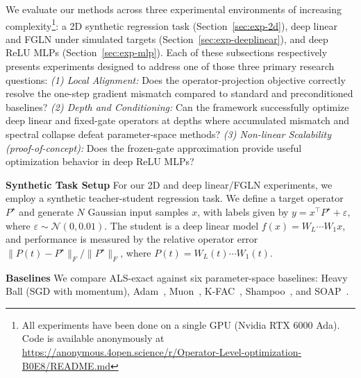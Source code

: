 \documentclass{article}
\newcommand{\normF}[1]{\|#1\|_F}
\begin{document}
We evaluate our methods across three experimental environments of increasing complexity\footnote{All experiments have been done on a single GPU (Nvidia RTX 6000 Ada). Code is available anonymously at \url{https://anonymous.4open.science/r/Operator-Level-optimization-B0E8/README.md}
}: a 2D synthetic regression task (Section~\ref{sec:exp-2d}), deep linear and FGLN under simulated targets (Section~\ref{sec:exp-deeplinear}), and deep ReLU MLPs (Section~\ref{sec:exp-mlp}). Each of these subsections respectively presents experiments designed to address one of those three primary research questions: \emph{ (1) Local Alignment:} Does the operator-projection objective correctly resolve the one-step gradient mismatch compared to standard and preconditioned baselines? \emph{(2) Depth and Conditioning:} Can the framework successfully optimize deep linear and fixed-gate operators at depths where accumulated mismatch and spectral collapse defeat parameter-space methods? \emph{(3) Non-linear Scalability (proof-of-concept):} Does the frozen-gate approximation provide useful optimization behavior in deep ReLU MLPs?

\textbf{Synthetic Task Setup}
For our 2D and deep linear/FGLN experiments, we employ a synthetic teacher-student regression task. We define a target operator $P^\star$ and generate $N$ Gaussian input samples $x$, with labels given by $y = x^\top P^\star + \varepsilon$, where $\varepsilon \sim \mathcal{N}(0, 0.01)$. The student is a deep linear model $f(x) = W_L \cdots W_1 x$, and performance is measured by the relative operator error $\normF{P(t) - P^\star} / \normF{P^\star}$, where $P(t) = W_L(t) \cdots W_1(t)$.


\textbf{Baselines}
\label{sec:exp-protocol}
We compare ALS-exact against six parameter-space baselines: Heavy Ball (SGD with momentum), Adam~\cite{kingma2015adam}, Muon~\cite{jordan2024muon}, K-FAC~\cite{martens2015optimizing}, Shampoo~\cite{gupta2018shampoo}, and SOAP~\cite{vyas2024soap}.
%
\end{document}
